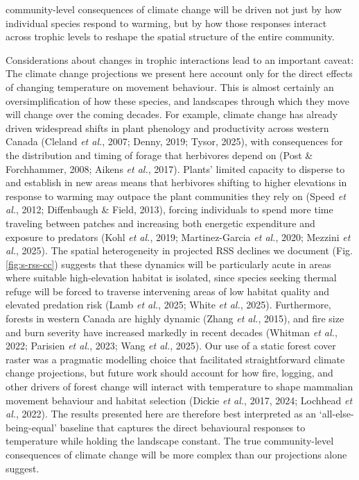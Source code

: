 \documentclass[
  12pt,
]{article}
\begin{document}
community-level consequences of climate change will be driven not just by how individual species respond to warming, but by how those responses interact across trophic levels to reshape the spatial structure of the entire community.

Considerations about changes in trophic interactions lead to an important caveat: The climate change projections we present here account only for the direct effects of changing temperature on movement behaviour. This is almost certainly an oversimplification of how these species, and landscapes through which they move will change over the coming decades. For example, climate change has already driven widespread shifts in plant phenology and productivity across western Canada (Cleland \emph{et al.}, 2007; Denny, 2019; Tysor, 2025), with consequences for the distribution and timing of forage that herbivores depend on (Post \& Forchhammer, 2008; Aikens \emph{et al.}, 2017). Plants' limited capacity to disperse to and establish in new areas means that herbivores shifting to higher elevations in response to warming may outpace the plant communities they rely on (Speed \emph{et al.}, 2012; Diffenbaugh \& Field, 2013), forcing individuals to spend more time traveling between patches and increasing both energetic expenditure and exposure to predators (Kohl \emph{et al.}, 2019; Martinez-Garcia \emph{et al.}, 2020; Mezzini \emph{et al.}, 2025). The spatial heterogeneity in projected RSS declines we document (Fig. \ref{fig:s-rss-cc}) suggests that these dynamics will be particularly acute in areas where suitable high-elevation habitat is isolated, since species seeking thermal refuge will be forced to traverse intervening areas of low habitat quality and elevated predation risk (Lamb \emph{et al.}, 2025; White \emph{et al.}, 2025). Furthermore, forests in western Canada are highly dynamic (Zhang \emph{et al.}, 2015), and fire size and burn severity have increased markedly in recent decades (Whitman \emph{et al.}, 2022; Parisien \emph{et al.}, 2023; Wang \emph{et al.}, 2025). Our use of a static forest cover raster was a pragmatic modelling choice that facilitated straightforward climate change projections, but future work should account for how fire, logging, and other drivers of forest change will interact with temperature to shape mammalian movement behaviour and habitat selection (Dickie \emph{et al.}, 2017, 2024; Lochhead \emph{et al.}, 2022). The results presented here are therefore best interpreted as an `all-else-being-equal' baseline that captures the direct behavioural responses to temperature while holding the landscape constant. The true community-level consequences of climate change will be more complex than our projections alone suggest.
\end{document}
